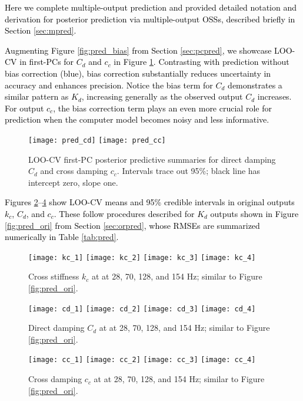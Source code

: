 \documentclass[12pt]{article}
\newcommand{\blu}[1]{\textcolor{black}{#1}} %
\begin{document}
{\blu{Here we complete multiple-output prediction and provided 
detailed notation and derivation for posterior prediction via 
multiple-output OSSs, described briefly in Section \ref{sec:mpred}.}

\blu{Augmenting Figure \ref{fig:pred_bias} from Section \ref{sec:pcpred}, we showcase
LOO-CV in first-PCs for $C_d$ and $c_c$ in Figure \ref{fig:pred_bias2}.
Contrasting with prediction without bias correction (blue), bias correction
substantially reduces uncertainty in accuracy and enhances precision. Notice
the bias term for $C_d$ demonstrates a similar pattern as $K_d$, increasing
generally as the observed output $C_d$ increases. For output $c_c$, the bias
correction term plays an even more crucial role for prediction when the
computer model becomes noisy and less informative.    }


\begin{figure}[ht!]
\centering
\texttt{[image: pred\_cd]}
\texttt{[image: pred\_cc]}
\caption{LOO-CV first-PC posterior predictive summaries 
for direct damping $C_d$ and cross damping $c_c$.  
Intervals trace out 95\%; black line has intercept zero, slope one.}
\label{fig:pred_bias2}
\end{figure}

\blu{
Figures \ref{fig:pred_ori2}--\ref{fig:pred_ori4} show LOO-CV means and 95\%
credible intervals in original outputs $k_c$,
$C_d$, and $c_c$. These follow procedures described for $K_d$ outputs shown in
Figure \ref{fig:pred_ori} from Section \ref{sec:orpred}, whose RMSEs are
summarized numerically in Table \ref{tab:pred}. }
%
\begin{figure}[ht!]
\centering
\texttt{[image: kc\_1]}
\texttt{[image: kc\_2]}
\texttt{[image: kc\_3]}
\texttt{[image: kc\_4]}
\caption{Cross stiffness $k_c$ at at 28, 70,
 128, and 154 Hz; similar to Figure \ref{fig:pred_ori}.}
\label{fig:pred_ori2}
\end{figure}
\begin{figure}[ht!]
\centering
\texttt{[image: cd\_1]}
\texttt{[image: cd\_2]}
\texttt{[image: cd\_3]}
\texttt{[image: cd\_4]}
\caption{Direct damping $C_d$ at at 28, 70,
 128, and 154 Hz; similar to Figure \ref{fig:pred_ori}.}
\label{fig:pred_ori3}
\end{figure}
\begin{figure}[ht!]
\centering
\texttt{[image: cc\_1]}
\texttt{[image: cc\_2]}
\texttt{[image: cc\_3]}
\texttt{[image: cc\_4]}
\caption{Cross damping $c_c$ at at 28, 70,
 128, and 154 Hz; similar to Figure \ref{fig:pred_ori}.}
\label{fig:pred_ori4}
\end{figure}

}
\end{document}
